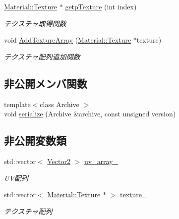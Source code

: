 \begin{DoxyCompactItemize}
\mbox{\hyperlink{class_md_bin_data_1_1_material_1_1_texture}{Material\+::\+Texture}} $\ast$ \mbox{\hyperlink{class_md_bin_data_1_1_mesh_1_1_u_v_set_aa082e3b5e2b3fb9d5a408b0b00ce9d2c}{getp\+Texture}} (int index)
\begin{DoxyCompactList}\small\item\em テクスチャ取得関数 \end{DoxyCompactList}\item 
void \mbox{\hyperlink{class_md_bin_data_1_1_mesh_1_1_u_v_set_a6b9333784f0a6b52dafebadd610da2cf}{Add\+Texture\+Array}} (\mbox{\hyperlink{class_md_bin_data_1_1_material_1_1_texture}{Material\+::\+Texture}} $\ast$texture)
\begin{DoxyCompactList}\small\item\em テクスチャ配列追加関数 \end{DoxyCompactList}\end{DoxyCompactItemize}
\subsection*{非公開メンバ関数}
\begin{DoxyCompactItemize}
\item 
{\footnotesize template$<$class Archive $>$ }\\void \mbox{\hyperlink{class_md_bin_data_1_1_mesh_1_1_u_v_set_aedd68d9b613f0f0b6513feb187ac4035}{serialize}} (Archive \&archive, const unsigned version)
\end{DoxyCompactItemize}
\subsection*{非公開変数類}
\begin{DoxyCompactItemize}
\item 
std\+::vector$<$ \mbox{\hyperlink{class_md_bin_data_1_1_vector2}{Vector2}} $>$ \mbox{\hyperlink{class_md_bin_data_1_1_mesh_1_1_u_v_set_a536dede8f5757658f374d561473cb935}{uv\+\_\+array\+\_\+}}
\begin{DoxyCompactList}\small\item\em U\+V配列 \end{DoxyCompactList}\item 
std\+::vector$<$ \mbox{\hyperlink{class_md_bin_data_1_1_material_1_1_texture}{Material\+::\+Texture}} $\ast$ $>$ \mbox{\hyperlink{class_md_bin_data_1_1_mesh_1_1_u_v_set_aee466b9ce749640ba6f3d547767148ba}{texture\+\_\+}}
\begin{DoxyCompactList}\small\item\em テクスチャ配列 \end{DoxyCompactList}\end{DoxyCompactItemize}
